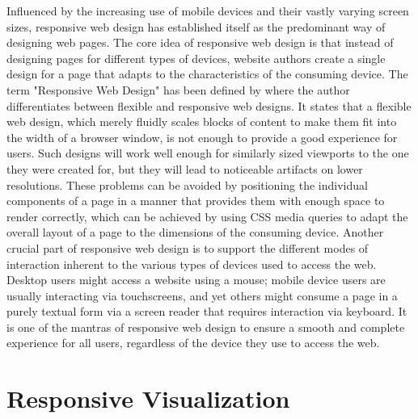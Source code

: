 Influenced by the increasing use of mobile devices and their vastly varying screen sizes, responsive web design has established itself as the predominant way of designing web pages. The core idea of responsive web design is that instead of designing pages for different types of devices, website authors create a single design for a page that adapts to the characteristics of the consuming device. The term "Responsive Web Design" has been defined by \cite{ResponsiveWebDesign} where the author differentiates between flexible and responsive web designs. It states that a flexible web design, which merely fluidly scales blocks of content to make them fit into the width of a browser window, is not enough to provide a good experience for users. Such designs will work well enough for similarly sized viewports to the one they were created for, but they will lead to noticeable artifacts on lower resolutions. These problems can be avoided by positioning the individual components of a page in a manner that provides them with enough space to render correctly, which can be achieved by using CSS media queries to adapt the overall layout of a page to the dimensions of the consuming device. Another crucial part of responsive web design is to support the different modes of interaction inherent to the various types of devices used to access the web. Desktop users might access a website using a mouse; mobile device users are usually interacting via touchscreens, and yet others might consume a page in a purely textual form via a screen reader that requires interaction via keyboard. It is one of the mantras of responsive web design to ensure a smooth and complete experience for all users, regardless of the device they use to access the web. 

\section{Responsive Visualization}

